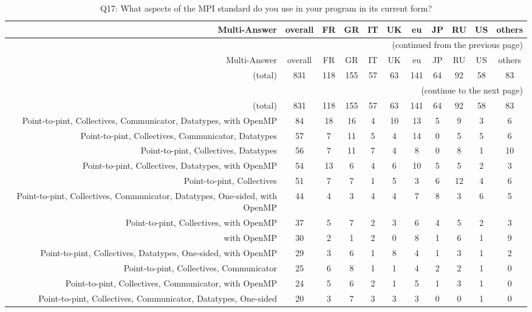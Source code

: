 \clearpage%
{\footnotesize\begin{landscape}%
\begin{longtable}[htb]{r|c|c|c|c|c|c|c|c|c|c}%
\caption{Q17: What aspects of the MPI standard do you use in your program in its current form?}%
\label{tab:Q17-mans} \\%
\hline%
Multi-Answer & overall & FR & GR & IT & UK & eu & JP & RU & US & others \\
 \hline%
\endfirsthead%
\multicolumn{11}{r}{(continued from the previous page)}\\%
\hline%
Multi-Answer & overall & FR & GR & IT & UK & eu & JP & RU & US & others \\
 \hline%
\endhead%
\hline%
(total) & 831 & 118 & 155 & 57 & 63 & 141 & 64 & 92 & 58 & 83 \\%
\hline%
\multicolumn{11}{r}{(continue to the next page)}\\%
\endfoot%
\hline%
(total) & 831 & 118 & 155 & 57 & 63 & 141 & 64 & 92 & 58 & 83 \\%
\hline%
\endlastfoot%
\hline%
{Point-to-pint, Collectives, Communicator, Datatypes, with OpenMP} & 84 & 18 & 16 & 4 & 10 & 13 & 5 & 9 & 3 & 6 \\%
{Point-to-pint, Collectives, Communicator, Datatypes} & 57 & 7 & 11 & 5 & 4 & 14 & 0 & 5 & 5 & 6 \\%
{Point-to-pint, Collectives, Datatypes} & 56 & 7 & 11 & 7 & 4 & 8 & 0 & 8 & 1 & 10 \\%
{Point-to-pint, Collectives, Datatypes, with OpenMP} & 54 & 13 & 6 & 4 & 6 & 10 & 5 & 5 & 2 & 3 \\%
{Point-to-pint, Collectives} & 51 & 7 & 7 & 1 & 5 & 3 & 6 & 12 & 4 & 6 \\%
{Point-to-pint, Collectives, Communicator, Datatypes, One-sided, with OpenMP} & 44 & 4 & 3 & 4 & 4 & 7 & 8 & 3 & 6 & 5 \\%
{Point-to-pint, Collectives, with OpenMP} & 37 & 5 & 7 & 2 & 3 & 6 & 4 & 5 & 2 & 3 \\%
{with OpenMP} & 30 & 2 & 1 & 2 & 0 & 8 & 1 & 6 & 1 & 9 \\%
{Point-to-pint, Collectives, Datatypes, One-sided, with OpenMP} & 29 & 3 & 6 & 1 & 8 & 4 & 1 & 3 & 1 & 2 \\%
{Point-to-pint, Collectives, Communicator} & 25 & 6 & 8 & 1 & 1 & 4 & 2 & 2 & 1 & 0 \\%
{Point-to-pint, Collectives, Communicator, with OpenMP} & 24 & 5 & 6 & 2 & 1 & 5 & 1 & 3 & 1 & 0 \\%
{Point-to-pint, Collectives, Communicator, Datatypes, One-sided} & 20 & 3 & 7 & 3 & 3 & 3 & 0 & 0 & 1 & 0 \\%

\end{longtable}
\end{landscape}}
